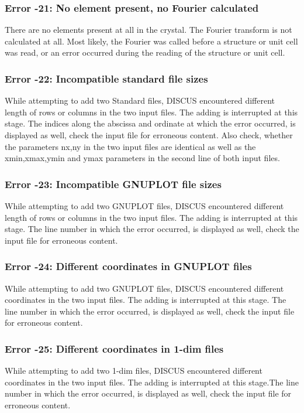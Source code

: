 \subsubsection{Error -21: No element present, no Fourier calculated}
\par
There are no elements present at all in the crystal. The Fourier 
transform is not calculated at all. Most likely, the Fourier 
was called before a structure or unit cell was read, or an error 
occurred during the reading of the structure or unit cell. 
\subsubsection{Error -22: Incompatible standard file sizes}
\par
While attempting to add two Standard files, DISCUS encountered 
different length of rows or columns in the two input files. The 
adding is interrupted at this stage. The indices along the 
abscissa and ordinate at which the error occurred, is displayed 
as well, check the input file for erroneous content. 
Also check, whether the parameters nx,ny in the two input files 
are identical as well as the xmin,xmax,ymin and ymax parameters 
in the second line of both input files. 
\subsubsection{Error -23: Incompatible GNUPLOT file sizes}
\par
While attempting to add two GNUPLOT files, DISCUS encountered 
different length of rows or columns in the two input files. The 
adding is interrupted at this stage. The line number in which 
the error occurred, is displayed as well, check the input file 
for erroneous content. 
\subsubsection{Error -24: Different coordinates in GNUPLOT files}
\par
While attempting to add two GNUPLOT files, DISCUS encountered 
different coordinates in the two input files. The adding 
is interrupted at this stage. The line number in which the 
error occurred, is displayed as well, check the input file for 
erroneous content. 
\subsubsection{Error -25: Different coordinates in 1-dim files}
\par
While attempting to add two 1-dim files, DISCUS encountered different 
coordinates in the two input files. The adding is interrupted at this 
stage.The line number in which the error occurred, is displayed as 
well, check the input file for erroneous content. 

